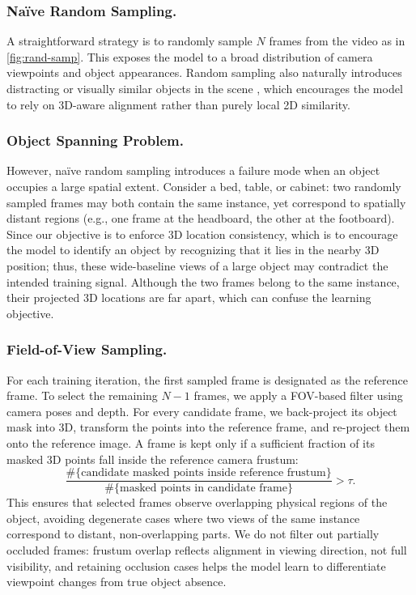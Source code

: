 \vspace{-1em}
\subsubsection{Naïve Random Sampling.}
A straightforward strategy is to randomly sample $N$ frames from the video as in \cref{fig:rand-samp}.
This exposes the model to a broad distribution of camera viewpoints and object appearances.  
Random sampling also naturally introduces distracting or visually similar objects in the scene 
, which encourages the model to rely on 3D-aware alignment rather than purely local 2D similarity.

\vspace{-1em}
\subsubsection{Object Spanning Problem.}
However, naïve random sampling introduces a failure mode when an object occupies a large spatial extent.  
Consider a bed, table, or cabinet: two randomly sampled frames may both contain the same instance, 
yet correspond to spatially distant regions (e.g., one frame at the headboard, the other at the footboard). 
Since our objective is to enforce 3D location consistency, which is to encourage the model to identify an object by recognizing that it lies in the nearby 3D position; thus, these wide-baseline views of a large object may contradict the intended training signal.  
Although the two frames belong to the same instance, their projected 3D locations are far apart, which can confuse the learning objective.

\vspace{-1em}
\subsubsection{Field-of-View Sampling.}
For each training iteration, the first sampled frame is designated as the reference frame.  
To select the remaining $N\!-\!1$ frames, we apply a FOV-based filter using camera poses and depth.  
For every candidate frame, we back-project its object mask into 3D, transform the points into the reference frame, and re-project them onto the reference image.  
A frame is kept only if a sufficient fraction of its masked 3D points fall inside the reference camera frustum:
\[
\frac{\#\{\text{candidate masked points inside reference frustum}\}}
       {\#\{\text{masked points in candidate frame}\}}
> \tau.
\]
This ensures that selected frames observe overlapping physical regions of the object, avoiding degenerate cases where two views of the same instance correspond to distant, non-overlapping parts.  
We do not filter out partially occluded frames: frustum overlap reflects alignment in viewing direction, not full visibility, and retaining occlusion cases helps the model learn to differentiate viewpoint changes from true object absence.

